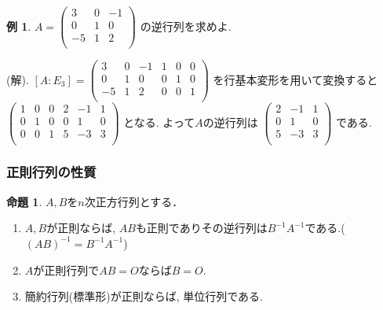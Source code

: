 \documentclass[dvipdfmx,a4paper,11pt]{article}
\theoremstyle{definition}
\newtheorem{prop}[thm]{命題}
\newtheorem{exa}[thm]{例}
\begin{document}
 \begin{exa}\cite[例題2.3]{M}
 $
  A=\begin{pmatrix}
 3& 0&-1\\
 0& 1 & 0 \\
 -5& 1 &  2 \\
 \end{pmatrix} 
 $
 の逆行列を求めよ.
 
 (解).
 $[A:E_3] = 
 \begin{pmatrix}
 3& 0&-1&1& 0&0 \\
 0& 1 & 0 &0& 1&0 \\
 -5& 1 &  2 &0& 0&1 \\
 \end{pmatrix} 
 $
 を行基本変形を用いて変換すると
 $
 \begin{pmatrix}
 1& 0&0  &2& -1&1 \\
 0& 1 & 0 &0& 1&0 \\
 0& 0&  1 &5& -3&3 \\
 \end{pmatrix} 
 $
 となる. よって$A$の逆行列は
 $
 \begin{pmatrix}
2& -1&1 \\
0& 1&0\\
5& -3&3  \\
 \end{pmatrix} 
 $
 である.
 \end{exa}

\subsubsection{正則行列の性質}
  
  
\begin{tcolorbox}[
    colback = white,
    colframe = green!35!black,
    fonttitle = \bfseries,
    breakable = true]
    \begin{prop}
    $A, B$を$n$次正方行列とする． 
 \begin{enumerate}
   \setlength{\parskip}{0cm} 
  \setlength{\itemsep}{0cm}
  \item$A, B$が正則ならば, $AB$も正則でありその逆行列は$B^{-1}A^{-1}$である.($(AB)^{-1} = B^{-1}A^{-1}$)
\item $A$が正則行列で$AB=O$ならば$B=O$.
\item 簡約行列(標準形)が正則ならば, 単位行列である.
 \end{enumerate}
  \end{prop}
  \end{tcolorbox}
  
\end{document}
